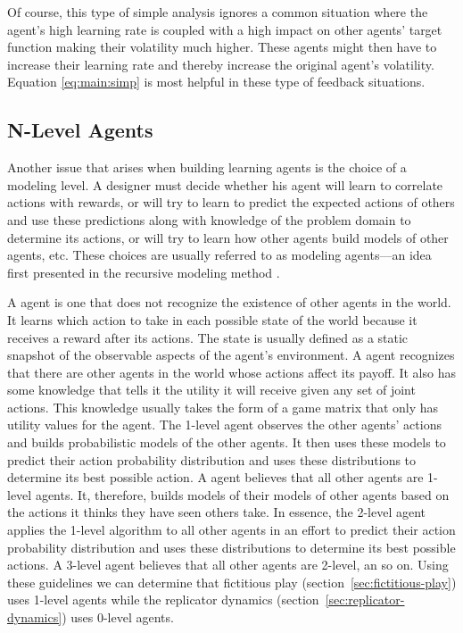 Of course, this type of simple analysis ignores a common situation
where the agent's high learning rate is coupled with a high impact on
other agents' target function making their volatility much higher.
These agents might then have to increase their learning rate and
thereby increase the original agent's volatility. Equation
\eqref{eq:main:simp} is most helpful in these type of feedback
situations.


\subsection{N-Level Agents}
\label{sec:n-level-agents}

Another issue that arises when building learning agents is the choice
of a modeling level. A designer must decide whether his agent will
learn to correlate actions with rewards, or will try to learn to
predict the expected actions of others and use these predictions along
with knowledge of the problem domain to determine its actions, or will
try to learn how other agents build models of other agents, etc. These
choices are usually referred to as  modeling agents---an
idea first presented in the recursive modeling method
\cite{gmytrasiewicz95a} \cite{gmytrasiewicz01a}.

A  agent is one that does not recognize the existence of
other agents in the world. It learns which action to take in each
possible state of the world because it receives a reward after its
actions. The state is usually defined as a static snapshot of the
observable aspects of the agent's environment. A  agent
recognizes that there are other agents in the world whose actions
affect its payoff.  It also has some knowledge that tells it the
utility it will receive given any set of joint actions. This knowledge
usually takes the form of a game matrix that only has utility values
for the agent. The 1-level agent observes the other agents' actions
and builds probabilistic models of the other agents. It then uses
these models to predict their action probability distribution and uses
these distributions to determine its best possible action. A
 agent believes that all other agents are 1-level agents.
It, therefore, builds models of their models of other agents based on
the actions it thinks they have seen others take. In essence, the
2-level agent applies the 1-level algorithm to all other agents in an
effort to predict their action probability distribution and uses these
distributions to determine its best possible actions. A 3-level agent
believes that all other agents are 2-level, an so on.  Using these
guidelines we can determine that fictitious play
(section~\ref{sec:fictitious-play}) uses 1-level agents while the
replicator dynamics (section~\ref{sec:replicator-dynamics}) uses
0-level agents.

